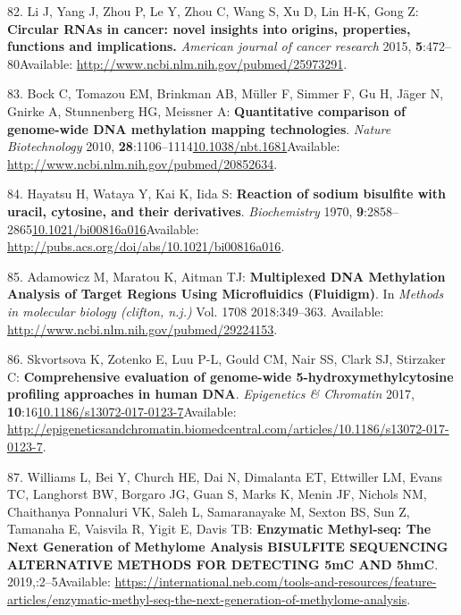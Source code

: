 \documentclass[
]{book}
\begin{document}
\leavevmode\hypertarget{ref-Li2015}{}%
82. Li J, Yang J, Zhou P, Le Y, Zhou C, Wang S, Xu D, Lin H-K, Gong Z: \textbf{Circular RNAs in cancer: novel insights into origins, properties, functions and implications.} \emph{American journal of cancer research} 2015, \textbf{5}:472--80Available: \url{http://www.ncbi.nlm.nih.gov/pubmed/25973291}.

\leavevmode\hypertarget{ref-Bock2010}{}%
83. Bock C, Tomazou EM, Brinkman AB, Müller F, Simmer F, Gu H, Jäger N, Gnirke A, Stunnenberg HG, Meissner A: \textbf{Quantitative comparison of genome-wide DNA methylation mapping technologies}. \emph{Nature Biotechnology} 2010, \textbf{28}:1106--1114\href{https://doi.org/10.1038/nbt.1681}{10.1038/nbt.1681}Available: \url{http://www.ncbi.nlm.nih.gov/pubmed/20852634}.

\leavevmode\hypertarget{ref-Hayatsu1970}{}%
84. Hayatsu H, Wataya Y, Kai K, Iida S: \textbf{Reaction of sodium bisulfite with uracil, cytosine, and their derivatives}. \emph{Biochemistry} 1970, \textbf{9}:2858--2865\href{https://doi.org/10.1021/bi00816a016}{10.1021/bi00816a016}Available: \url{http://pubs.acs.org/doi/abs/10.1021/bi00816a016}.

\leavevmode\hypertarget{ref-Adamowicz2018}{}%
85. Adamowicz M, Maratou K, Aitman TJ: \textbf{Multiplexed DNA Methylation Analysis of Target Regions Using Microfluidics (Fluidigm)}. In \emph{Methods in molecular biology (clifton, n.j.)} Vol. 1708 2018:349--363. Available: \url{http://www.ncbi.nlm.nih.gov/pubmed/29224153}.

\leavevmode\hypertarget{ref-Skvortsova2017}{}%
86. Skvortsova K, Zotenko E, Luu P-L, Gould CM, Nair SS, Clark SJ, Stirzaker C: \textbf{Comprehensive evaluation of genome-wide 5-hydroxymethylcytosine profiling approaches in human DNA}. \emph{Epigenetics \& Chromatin} 2017, \textbf{10}:16\href{https://doi.org/10.1186/s13072-017-0123-7}{10.1186/s13072-017-0123-7}Available: \url{http://epigeneticsandchromatin.biomedcentral.com/articles/10.1186/s13072-017-0123-7}.

\leavevmode\hypertarget{ref-Williams2019}{}%
87. Williams L, Bei Y, Church HE, Dai N, Dimalanta ET, Ettwiller LM, Evans TC, Langhorst BW, Borgaro JG, Guan S, Marks K, Menin JF, Nichols NM, Chaithanya Ponnaluri VK, Saleh L, Samaranayake M, Sexton BS, Sun Z, Tamanaha E, Vaisvila R, Yigit E, Davis TB: \textbf{Enzymatic Methyl-seq: The Next Generation of Methylome Analysis BISULFITE SEQUENCING ALTERNATIVE METHODS FOR DETECTING 5mC AND 5hmC}. 2019,:2--5Available: \url{https://international.neb.com/tools-and-resources/feature-articles/enzymatic-methyl-seq-the-next-generation-of-methylome-analysis}.
\end{document}
